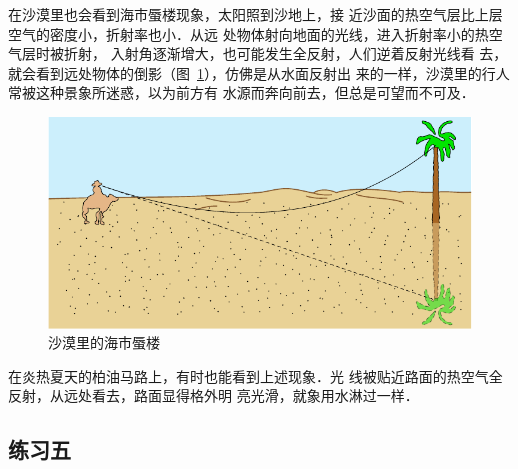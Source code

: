 在沙漠里也会看到海市蜃楼现象，太阳照到沙地上，接
近沙面的热空气层比上层空气的密度小，折射率也小．从远
处物体射向地面的光线，进入折射率小的热空气层时被折射，
入射角逐渐增大，也可能发生全反射，人们逆着反射光线看
去，就会看到远处物体的倒影（图~\ref{fig_C_5-28}），仿佛是从水面反射出
来的一样，沙漠里的行人常被这种景象所迷惑，以为前方有
水源而奔向前去，但总是可望而不可及．
\begin{figure}[htbp]
    \centering
    \includegraphics{fig/C/5-28.pdf}
    \caption{沙漠里的海市蜃楼}\label{fig_C_5-28}
\end{figure}

在炎热夏天的柏油马路上，有时也能看到上述现象．光
线被贴近路面的热空气全反射，从远处看去，路面显得格外明
亮光滑，就象用水淋过一样．

\subsection*{练习五}

